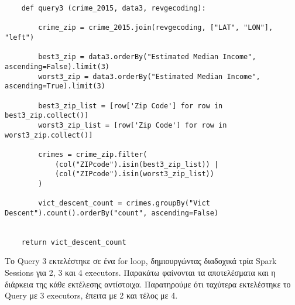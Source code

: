 \documentclass{article}
\begin{document}
\begin{lstlisting}
    def query3 (crime_2015, data3, revgecoding):

        crime_zip = crime_2015.join(revgecoding, ["LAT", "LON"], "left")

        best3_zip = data3.orderBy("Estimated Median Income", ascending=False).limit(3)
        worst3_zip = data3.orderBy("Estimated Median Income", ascending=True).limit(3)
        
        best3_zip_list = [row['Zip Code'] for row in best3_zip.collect()] 
        worst3_zip_list = [row['Zip Code'] for row in worst3_zip.collect()]

        crimes = crime_zip.filter(
            (col("ZIPcode").isin(best3_zip_list)) | 
            (col("ZIPcode").isin(worst3_zip_list))
        )
        
        vict_descent_count = crimes.groupBy("Vict Descent").count().orderBy("count", ascending=False)


    return vict_descent_count
\end{lstlisting}

\vspace{3\baselineskip}

Το Query 3 εκτελέστηκε σε ένα for loop, δημιουργώντας διαδοχικά τρία Spark Sessions για 2, 3 και 4 executors. Παρακάτω φαίνονται τα αποτελέσματα και η διάρκεια της κάθε εκτέλεσης αντίστοιχα. 
Παρατηρούμε ότι ταχύτερα εκτελέστηκε το Query με 3 executors, έπειτα με 2 και τέλος με 4. \\
\end{document}
